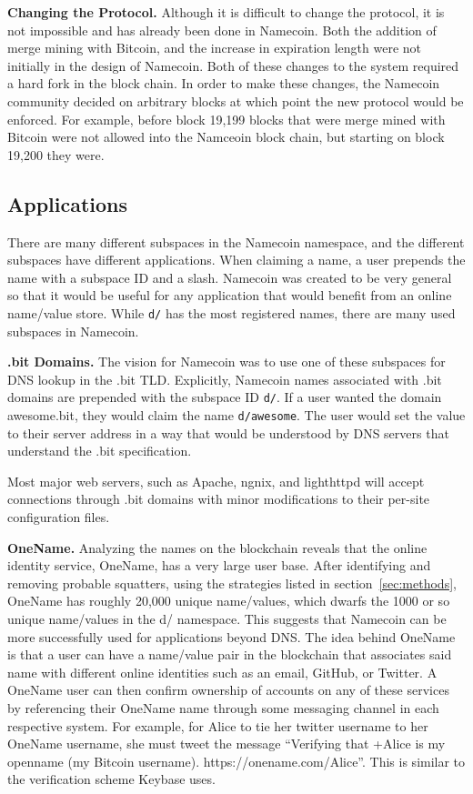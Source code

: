 {\bf Changing the Protocol.}
Although it is difficult to change the protocol, it is not impossible and has already been done in Namecoin. Both the addition of merge mining with Bitcoin, and the increase in expiration length were not initially in the design of Namecoin. Both of these changes to the system required a hard fork in the block chain. In order to make these changes, the Namecoin community decided on arbitrary blocks at which point the new protocol would be enforced. For example, before block 19,199 blocks that were merge mined with Bitcoin were not allowed into the Namceoin block chain, but starting on block 19,200 they were. 
 
\subsection{Applications}

There are many different subspaces in the Namecoin namespace, and the different subspaces have different applications. When claiming a name, a user prepends the name with a subspace ID and a slash. Namecoin was created to be very general so that it would be useful for any application that would benefit from an online name/value store. While {\tt d/} has the most registered names, there are many used subspaces in Namecoin.

{\bf .bit Domains.}
The vision for Namecoin was to use one of these subspaces for DNS lookup in the .bit TLD. Explicitly, Namecoin names associated with .bit domains are prepended with the subspace ID {\tt d/}. If a user wanted the domain awesome.bit, they would claim the name {\tt d/awesome}. The user would set the value to their server address in a way that would be understood by DNS servers that understand the .bit specification\cite{bitdnsspec}.

Most major web servers, such as Apache, ngnix, and lighthttpd will accept connections through .bit domains with minor modifications to their per-site configuration files.

{\bf OneName.}
Analyzing the names on the blockchain reveals that the online identity service, OneName, has a very large user base. After identifying and removing probable squatters, using the strategies listed in section~\ref{sec:methods}, OneName has roughly 20,000 unique name/values, which dwarfs the 1000 or so unique name/values in the d/ namespace. This suggests that Namecoin can be more successfully used for applications beyond DNS. The idea behind OneName is that a user can have a name/value pair in the blockchain that associates said name with different online identities such as an email, GitHub, or Twitter. A OneName user can then confirm ownership of accounts on any of these services by referencing their OneName name through some messaging channel in each respective system. For example, for Alice to tie her twitter username to her OneName username, she must tweet the message ``Verifying that +Alice is my openname (my Bitcoin username). https://onename.com/Alice''. This is similar to the verification scheme Keybase uses.

